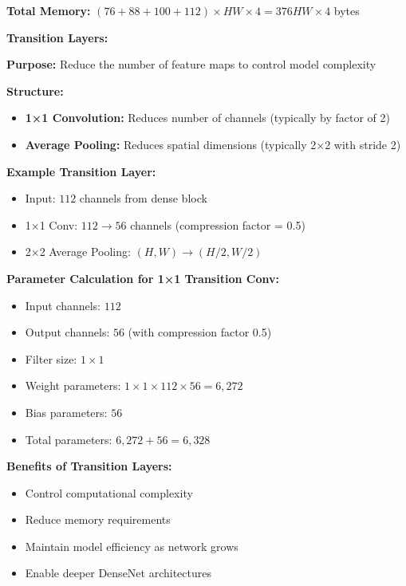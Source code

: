\documentclass[12pt]{article}
\begin{document}
\begin{enumerate}[(a)]
{    \textbf{Total Memory:} $(76 + 88 + 100 + 112) \times HW \times 4 = 376HW \times 4$ bytes
    
    \textbf{Transition Layers:}
    
    \textbf{Purpose:} Reduce the number of feature maps to control model complexity
    
    \textbf{Structure:}
    \begin{itemize}
        \item \textbf{1×1 Convolution:} Reduces number of channels (typically by factor of 2)
        \item \textbf{Average Pooling:} Reduces spatial dimensions (typically 2×2 with stride 2)
    \end{itemize}
    
    \textbf{Example Transition Layer:}
    \begin{itemize}
        \item Input: $112$ channels from dense block
        \item 1×1 Conv: $112 \to 56$ channels (compression factor = 0.5)
        \item 2×2 Average Pooling: $(H, W) \to (H/2, W/2)$
    \end{itemize}
    
    \textbf{Parameter Calculation for 1×1 Transition Conv:}
    \begin{itemize}
        \item Input channels: $112$
        \item Output channels: $56$ (with compression factor 0.5)
        \item Filter size: $1 \times 1$
        \item Weight parameters: $1 \times 1 \times 112 \times 56 = 6,272$
        \item Bias parameters: $56$
        \item Total parameters: $6,272 + 56 = 6,328$
    \end{itemize}
    
    \textbf{Benefits of Transition Layers:}
    \begin{itemize}
        \item Control computational complexity
        \item Reduce memory requirements
        \item Maintain model efficiency as network grows
        \item Enable deeper DenseNet architectures
    \end{itemize}
    }
    

\end{enumerate}
\end{document}
